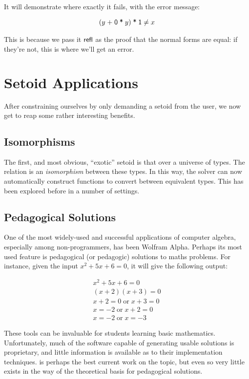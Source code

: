 \documentclass[draft, twocolumn]{article}
\theoremstyle{definition}
\theoremstyle{definition}
\begin{document}

It will demonstrate where exactly it fails, with the error message:

\[
 (y \; \AgdaFunction{+} \; \AgdaNumber{0} \; \AgdaFunction{*} \; y) \;
 \AgdaFunction{*} \;
 \AgdaNumber{1} \neq x
\]

This is because we pass it \(\AgdaField{refl}\) as the proof that the normal
forms are equal: if they're not, this is where we'll get an error.
\section{Setoid Applications} \label{equivalence}
After constraining ourselves by only demanding a setoid from the user, we now
get to reap some rather interesting benefits.
\subsection{Isomorphisms}
The first, and most obvious, ``exotic'' setoid is that over a universe of types.
The relation is an \emph{isomorphism} between these types. In this way, the
solver can now automatically construct functions to convert between equivalent
types. This has been explored before in a number of settings.
\subsection{Pedagogical Solutions} 
One of the most widely-used and successful applications of computer algebra,
especially among non-programmers, has been Wolfram
Alpha\cite{wolfram_research_inc._wolframalpha_2019}. Perhaps its most used
feature is pedagogical (or pedagogic) solutions to maths
problems\cite{the_development_team_step-by-step_2009}. For instance, given the
input \(x^2 + 5 x + 6 = 0\), it will give the following output:

\begin{align*}
  x^2 + 5x + 6   = 0 \\
  (x + 2)(x + 3) = 0 \\
  x + 2 = 0   \; \text{or} \; x + 3 = 0 \\
  x     = -2  \; \text{or} \; x + 2 = 0 \\
  x     = -2  \; \text{or} \; x     = -3
\end{align*}

These tools can be invaluable for students learning basic mathematics.
Unfortunately, much of the software capable of generating usable solutions is
proprietary, and little information is available as to their implementation
techniques.\cite{lioubartsev_constructing_2016} is perhaps the best current work
on the topic, but even so very little exists in the way of the theoretical basis
for pedagogical solutions.
\end{document}

